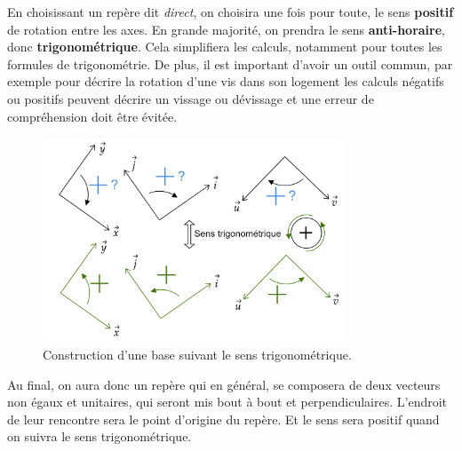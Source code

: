 \documentclass[
	11pt, %
	fleqn, %
	a4paper, %
]{LegrandOrangeBook}
\begin{document}
En choisissant un repère dit \textit{direct}, on choisira une fois pour toute, le sens \textbf{positif} de rotation entre les axes. En grande majorité, on prendra le sens \textbf{anti-horaire}, donc \textbf{trigonométrique}. Cela simplifiera les calculs, notamment pour toutes les formules de trigonométrie. De plus, il est important d'avoir un outil commun, par exemple pour décrire la rotation d'une vis dans son logement les calculs négatifs ou positifs peuvent décrire un vissage ou dévissage et une erreur de compréhension doit être évitée.

\begin{figure}[H] %
	\centering %
	\includegraphics[width=0.8\textwidth]{Images/direct1.png} %
	\caption{Construction d'une base suivant le sens trigonométrique.}
	\label{direct1} %
\end{figure}



\begin{theorem}
Au final, on aura donc un repère qui en général, se composera de deux vecteurs non égaux et unitaires, qui seront mis bout à bout et perpendiculaires. L'endroit de leur rencontre sera le point d'origine du repère. Et le sens sera positif quand on suivra le sens trigonométrique.
\end{theorem}
\end{document}
